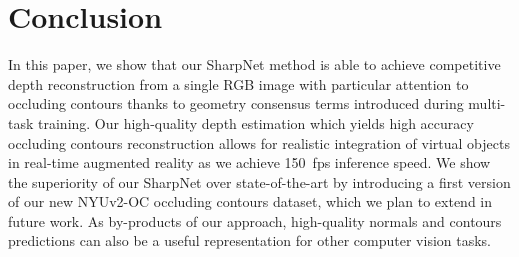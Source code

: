 \documentclass[10pt,twocolumn,letterpaper]{article}
\begin{document}
\section{Conclusion}


In this paper, we  show that our SharpNet method is  able to achieve competitive
depth  reconstruction from  a  single  RGB image  with  particular attention  to
occluding  contours  thanks  to   geometry  consensus  terms  introduced  during
multi-task  training.   Our high-quality  depth  estimation which yields high  
accuracy occluding  contours reconstruction allows for realistic integration  
of virtual objects in real-time augmented reality as we achieve 150~fps 
inference speed.
We show  the superiority of our SharpNet over state-of-the-art by introducing a
first version  of our new NYUv2-OC occluding contours dataset, which we plan to
extend in future work. As by-products of our approach, high-quality normals and 
contours predictions can also be a useful representation for other computer 
vision tasks.
\vspace{20pt}
 
{\small


}
\end{document}
